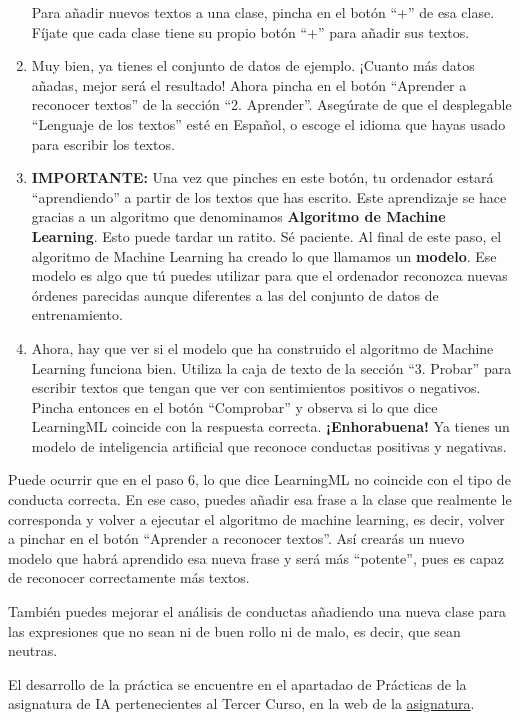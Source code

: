 \begin{enumerate}
    Para añadir nuevos textos a una clase, pincha en el botón ``+'' de esa clase. Fíjate que cada clase tiene su propio botón ``+'' para añadir sus textos.
    \item Muy bien, ya tienes el conjunto de datos de ejemplo. ¡Cuanto más datos añadas, mejor será el resultado! Ahora pincha en el botón ``Aprender a reconocer textos'' de la sección ``2. Aprender''. Asegúrate de que el desplegable ``Lenguaje de los textos'' esté en Español, o escoge el idioma que hayas usado para escribir los textos.
    \item \textbf{IMPORTANTE:} Una vez que pinches en este botón, tu ordenador estará ``aprendiendo'' a partir de los textos que has escrito. Este aprendizaje se hace gracias a un algoritmo que denominamos \textbf{Algoritmo de Machine Learning}. Esto puede tardar un ratito. Sé paciente. Al final de este paso, el algoritmo de Machine Learning ha creado lo que llamamos un \textbf{modelo}. Ese modelo es algo que tú puedes utilizar para que el ordenador reconozca nuevas órdenes parecidas aunque diferentes a las del conjunto de datos de entrenamiento.
    \item Ahora, hay que ver si el modelo que ha construido el algoritmo de Machine Learning funciona bien. Utiliza la caja de texto de la sección ``3. Probar'' para escribir textos que tengan que ver con sentimientos positivos o negativos. Pincha entonces en el botón ``Comprobar'' y observa si lo que dice LearningML coincide con la respuesta correcta.\newline
    \textbf{¡Enhorabuena!} Ya tienes un modelo de inteligencia artificial que reconoce conductas positivas y negativas.
\end{enumerate}

Puede ocurrir que en el paso 6, lo que dice LearningML no coincide con el tipo de conducta correcta. En ese caso, puedes añadir esa frase a la clase que realmente le corresponda y volver a ejecutar el algoritmo de machine learning, es decir, volver a pinchar en el botón ``Aprender a reconocer textos''. Así crearás un nuevo modelo que habrá aprendido esa nueva frase y será más ``potente'', pues es capaz de reconocer correctamente más textos.

También puedes mejorar el análisis de conductas añadiendo una nueva clase para las expresiones que no sean ni de buen rollo ni de malo, es decir, que sean neutras.

El desarrollo de la práctica se encuentre en el apartadao de Prácticas de la asignatura de IA pertenecientes al Tercer Curso, en la web de la \href{https://github.com/ElblogdeIsmael/ElblogdeIsmael.github.io}{asignatura}.

